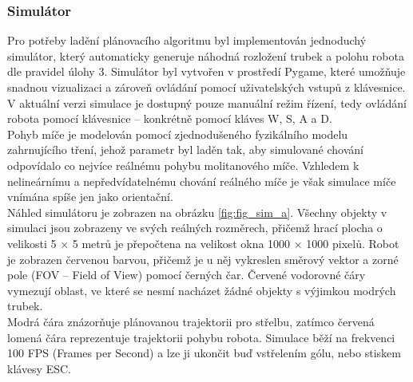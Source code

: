\documentclass[a4paper,12pt]{article}
\begin{document}
\subsubsection{Simulátor}
Pro potřeby ladění plánovacího algoritmu byl implementován jednoduchý simulátor, který automaticky generuje náhodná rozložení trubek a polohu robota dle pravidel úlohy 3. Simulátor byl vytvořen v prostředí Pygame, které umožňuje snadnou vizualizaci a zároveň ovládání pomocí uživatelských vstupů z klávesnice. V aktuální verzi simulace je dostupný pouze manuální režim řízení, tedy ovládání robota pomocí klávesnice – konkrétně pomocí kláves W, S, A a D.\\
Pohyb míče je modelován pomocí zjednodušeného fyzikálního modelu zahrnujícího tření, jehož parametr byl laděn tak, aby simulované chování odpovídalo co nejvíce reálnému pohybu molitanového míče. Vzhledem k nelineárnímu a nepředvídatelnému chování reálného míče je však simulace míče vnímána spíše jen jako orientační.\\
Náhled simulátoru je zobrazen na obrázku \ref{fig:fig_sim_a}. Všechny objekty v simulaci jsou zobrazeny ve svých reálných rozměrech, přičemž hrací plocha o velikosti 5 × 5 metrů je přepočtena na velikost okna 1000 × 1000 pixelů. Robot je zobrazen červenou barvou, přičemž je u něj vykreslen směrový vektor a zorné pole (FOV – Field of View) pomocí černých čar. Červené vodorovné čáry vymezují oblast, ve které se nesmí nacházet žádné objekty s výjimkou modrých trubek.\\
Modrá čára znázorňuje plánovanou trajektorii pro střelbu, zatímco červená lomená čára reprezentuje trajektorii pohybu robota. Simulace běží na frekvenci 100 FPS (Frames per Second) a lze ji ukončit buď vstřelením gólu, nebo stiskem klávesy ESC.
\end{document}
